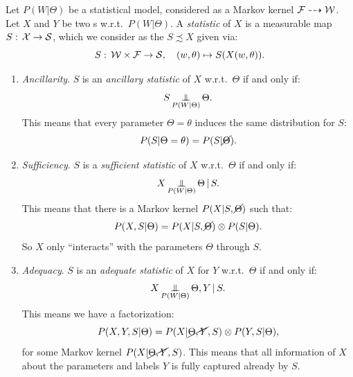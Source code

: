 \begin{Eg} Let $P(W|\Theta)$ be a statistical model, considered as a Markov kernel $\mathcal{F} \dashrightarrow \mathcal{W}$. Let $X$ and $Y$ be two \trv{}s w.r.t.\ $P(W|\Theta)$.
    A \emph{statistic} of $X$ is a measurable map $S:\,\mathcal{X} \to \mathcal{S}$, which we consider as the  \trv{} $S\precsim X$ given via:
    \[ S:\,\mathcal{W} \times \mathcal{F} \to \mathcal{S},\quad (w,\theta) \mapsto S(X(w,\theta)). \]
\begin{enumerate}
\item \emph{Ancillarity}. $S$ is an \emph{ancillary statistic} of $X$ w.r.t.\ $\Theta$ if and only if:
\[ S \operatorname*{\perp\mkern-11mu\perp}_{P(W|\Theta)} \Theta.\]
This means that every parameter $\Theta=\theta$ induces the same distribution for $S$: 
\[P(S|\Theta=\theta) = P(S|\cancel{\Theta}).\]
\item \emph{Sufficiency}. $S$ is a \emph{sufficient statistic} of $X$ w.r.t.\ $\Theta$ if and only if:
\[ X \operatorname*{\perp\mkern-11mu\perp}_{P(W|\Theta)} \Theta \operatorname*{|} S.\]
This means that there is a Markov kernel $P(X|S,\cancel{\Theta})$ such that:
\[ P(X,S|\Theta) = P(X|S,\cancel{\Theta}) \otimes P(S|\Theta).\]
So $X$ only ``interacts'' with the parameters $\Theta$ through $S$.
\item \emph{Adequacy}. $S$ is an \emph{adequate statistic} of $X$ for $Y$ w.r.t.\ $\Theta$ if and only if:
\[ X \operatorname*{\perp\mkern-11mu\perp}_{P(W|\Theta)} \Theta,Y \operatorname*{|} S.\]
This means we have a factorization:
\[ P(X,Y,S|\Theta) = P(X|\cancel{\Theta,Y},S) \otimes P(Y,S|\Theta),\]
for some Markov kernel $P(X|\cancel{\Theta,Y},S)$.
This means that all information of $X$ about the parameters and labels $Y$ is fully captured already by $S$.
\end{enumerate}
\end{Eg}

